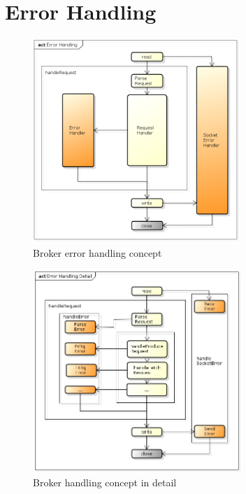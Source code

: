 \section{Error Handling}

\begin{figure}[H]
    \centering
    \includegraphics[width=0.7\textwidth]{images/broker-error-activity.png}
    \caption{Broker error handling concept}
    \label{fig:broker-error-activity.png}
\end{figure}


\begin{figure}[H]
    \centering
    \includegraphics[width=0.7\textwidth]{images/broker-error-activity-detail.png}
    \caption{Broker handling concept in detail}
    \label{fig:broker-error-activity-detail.png}
\end{figure}

